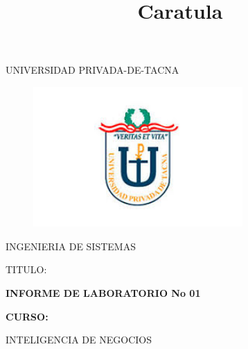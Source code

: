 \documentclass[12pt,letterpaper]{article}
\begin{document}
%


\title{Caratula}

\begin{titlepage}
\begin{center}
\large{UNIVERSIDAD PRIVADA-DE-TACNA}\\
\vspace*{-0.025in}
\begin{figure}[htb]
\begin{center}
\includegraphics[width=8cm]{./Imagenes/logo}
\end{center}
\end{figure}
\vspace*{0.15in}
INGENIERIA DE SISTEMAS  \\

\vspace*{0.5in}
\begin{large}
TITULO:\\
\end{large}

\vspace*{0.1in}
\begin{Large}
\textbf{INFORME DE LABORATORIO No 01} \\
\end{Large}

\vspace*{0.3in}
\begin{Large}
\textbf{CURSO:} \\
\end{Large}

\vspace*{0.1in}
\begin{large}
INTELIGENCIA DE NEGOCIOS\\
\end{large}


\end{center}
\end{titlepage}
\end{document}
